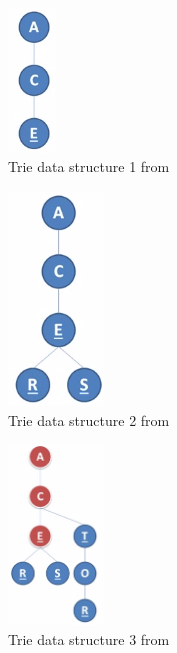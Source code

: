 \documentclass{report}
\begin{document}
\begin{multicols}{3}
\begin{figure}[H]
\centering
\includegraphics[width=0.5in]{Triestep1}
\caption{Trie data structure 1 from \cite{youtubetrie}}
\label{fig:triestep1}
\end{figure}
\begin{figure}[H]
\centering
\includegraphics[width=1in]{Triestep2}
\caption{Trie data structure 2 from \cite{youtubetrie}}
\label{fig:triestep2}
\end{figure}
\begin{figure}[H]
\centering
\includegraphics[width=1in]{Triestep3}
\caption{Trie data structure 3 from \cite{youtubetrie}}
\label{fig:triestep3}
\end{figure}
\end{multicols}
\end{document}
